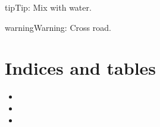 \documentclass[letterpaper,10pt,english]{sphinxmanual}
\begin{document}
\begin{sphinxadmonition}{tip}{Tip:}
Mix with water.
\end{sphinxadmonition}

\begin{sphinxadmonition}{warning}{Warning:}
Cross road.
\end{sphinxadmonition}


\chapter{Indices and tables}
\label{\detokenize{index:indices-and-tables}}\begin{itemize}
\item {} 

\item {} 

\item {} 

\end{itemize}



\renewcommand{\indexname}{Index}
\printindex
\end{document}
